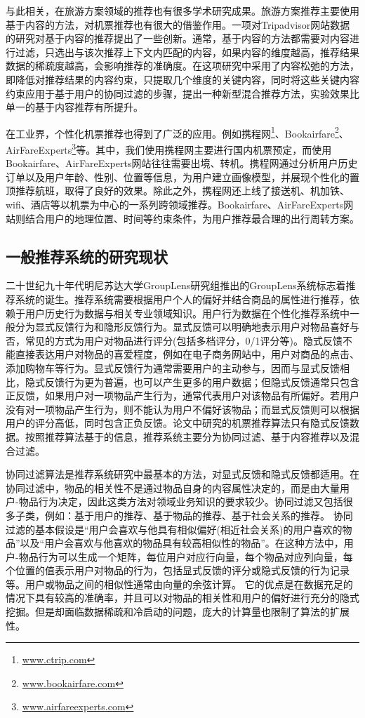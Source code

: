 与此相关，在旅游方案领域的推荐也有很多学术研究成果。旅游方案推荐主要使用基于内容的方法，对机票推荐也有很大的借鉴作用。一项对Tripadvisor网站数据的研究对基于内容的推荐提出了一些创新。通常，基于内容的方法都需要对内容进行过滤，只选出与该次推荐上下文内匹配的内容，如果内容的维度越高，推荐结果数据的稀疏度越高，会影响推荐的准确度。在这项研究中采用了内容松弛的方法，即降低对推荐结果的内容约束，只提取几个维度的关键内容，同时将这些关键内容约束应用于基于用户的协同过滤的步骤，提出一种新型混合推荐方法，实验效果比单一的基于内容推荐有所提升。

在工业界，个性化机票推荐也得到了广泛的应用。例如携程网\footnote{\url{www.ctrip.com}}、Bookairfare\footnote{\url{www.bookairfare.com}}、AirFareExperts\footnote{\url{www.airfareexperts.com}}等。其中，我们使用携程网主要进行国内机票预定，而使用Bookairfare、AirFareExperts网站往往需要出境、转机。携程网通过分析用户历史订单以及用户年龄、性别、位置等信息，为用户建立画像模型，并展现个性化的置顶推荐航班，取得了良好的效果。除此之外，携程网还上线了接送机、机加铁、wifi、酒店等以机票为中心的一系列跨领域推荐。Bookairfare、AirFareExperts网站则结合用户的地理位置、时间等约束条件，为用户推荐最合理的出行周转方案。

\subsection{一般推荐系统的研究现状}

二十世纪九十年代明尼苏达大学GroupLens研究组推出的GroupLens系统标志着推荐系统的诞生。推荐系统需要根据用户个人的偏好并结合商品的属性进行推荐，依赖于用户历史行为数据与相关专业领域知识。用户行为数据在个性化推荐系统中一般分为显式反馈行为和隐形反馈行为。显式反馈可以明确地表示用户对物品喜好与否，常见的方式为用户对物品进行评分(包括多档评分，0/1评分等)。隐式反馈不能直接表达用户对物品的喜爱程度，例如在电子商务网站中，用户对商品的点击、添加购物车等行为。显式反馈行为通常需要用户的主动参与，因而与显式反馈相比，隐式反馈行为更为普遍，也可以产生更多的用户数据；但隐式反馈通常只包含正反馈，如果用户对一项物品产生行为，通常代表用户对该物品有所偏好。若用户没有对一项物品产生行为，则不能认为用户不偏好该物品；而显式反馈则可以根据用户的评分高低，同时包含正负反馈。论文中研究的机票推荐算法只有隐式反馈数据。按照推荐算法基于的信息，推荐系统主要分为协同过滤、基于内容推荐以及混合过滤。
		
协同过滤算法是推荐系统研究中最基本的方法，对显式反馈和隐式反馈都适用。在协同过滤中，物品的相关性不是通过物品自身的内容属性决定的，而是由大量用户-物品行为决定，因此这类方法对领域业务知识的要求较少。协同过滤又包括很多子类，例如：基于用户的推荐、基于物品的推荐、基于社会关系的推荐。
协同过滤的基本假设是“用户会喜欢与他具有相似偏好(相近社会关系)的用户喜欢的物品”以及“用户会喜欢与他喜欢的物品具有较高相似性的物品”。在这种方法中，用户-物品行为可以生成一个矩阵，每位用户对应行向量，每个物品对应列向量，每个位置的值表示用户对物品的行为，包括显式反馈的评分或隐式反馈的行为记录等。用户或物品之间的相似性通常由向量的余弦计算。
它的优点是在数据充足的情况下具有较高的准确率，并且可以对物品的相关性和用户的偏好进行充分的隐式挖掘。但是却面临数据稀疏和冷启动的问题，庞大的计算量也限制了算法的扩展性。
		
